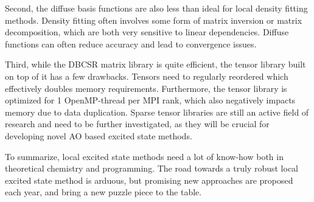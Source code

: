 Second, the diffuse basis functions are also less than ideal for local density fitting methods. Density fitting often involves some form of matrix inversion or matrix decomposition, which are both very sensitive to linear dependencies. Diffuse functions can often reduce accuracy and lead to convergence issues. 

Third, while the DBCSR matrix library is quite efficient, the tensor library built on top of it has a few drawbacks. Tensors need to regularly reordered which effectively doubles memory requirements. Furthermore, the tensor library is optimized for 1 OpenMP-thread per MPI rank, which also negatively impacts memory due to data duplication. Sparse tensor libraries are still an active field of research and need to be further investigated, as they will be crucial for developing novel AO based excited state methods.

To summarize, local excited state methods need a lot of know-how both in theoretical chemistry and programming. The road towards a truly robust local excited state method is arduous, but promising new approaches are proposed each year, and bring a new puzzle piece to the table.
